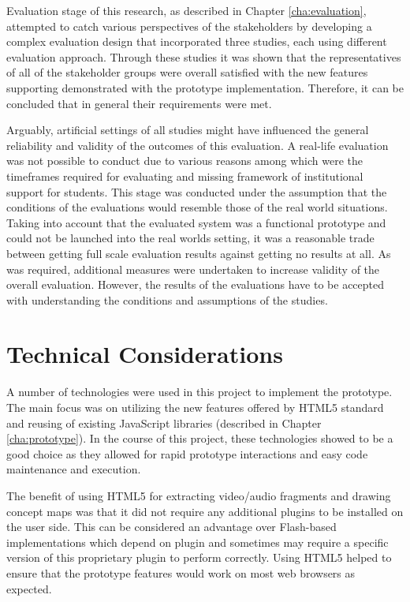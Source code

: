 
Evaluation stage of this research, as described in Chapter \ref{cha:evaluation},
attempted to catch various perspectives of the stakeholders by developing a
complex evaluation design that incorporated three studies, each using different
evaluation approach. Through these studies it was shown that the representatives
of all of the stakeholder groups were overall satisfied with the new features
supporting \LLLs demonstrated with the prototype implementation. Therefore, it
can be concluded that in general their requirements were met.

Arguably, artificial settings of all studies might have influenced the general
reliability and validity of the outcomes of this evaluation. A real-life
evaluation was not possible to conduct due to various reasons among which were
the timeframes required for evaluating \LLLs and missing framework of
institutional support for students. This stage was conducted under the
assumption that the conditions of the evaluations would resemble those of the
real world situations. Taking into account that the evaluated system was a
functional prototype and could not be launched into the real worlds setting, it
was a reasonable trade between getting full scale evaluation results against
getting no results at all. As was required, additional measures were undertaken
to increase validity of the overall evaluation. However, the results of the
evaluations have to be accepted with understanding the conditions and
assumptions of the studies.

\section{Technical Considerations}
A number of technologies were used in this project to implement the prototype.
The main focus was on utilizing the new features offered by HTML5 standard and
reusing of existing JavaScript libraries (described in Chapter
\ref{cha:prototype}). In the course of this project, these technologies showed
to be a good choice as they allowed for rapid prototype interactions and easy
code maintenance and execution.

The benefit of using HTML5 for extracting video/audio fragments and drawing
concept maps was that it did not require any additional plugins to be installed
on the user side. This can be considered an advantage over Flash-based
implementations which depend on plugin and sometimes may require a specific
version of this proprietary plugin to perform correctly. Using HTML5 helped to
ensure that the prototype features would work on most web browsers as expected.

